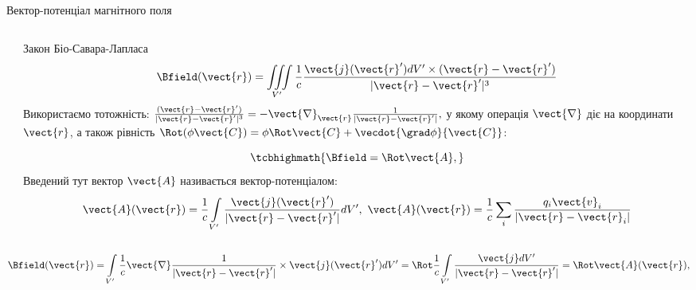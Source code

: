 \documentclass{beamer}
\begin{document}
\begin{frame}[t]{Вектор-потенціал магнітного поля}{}
\begin{columns}
\begin{column}{0.3\linewidth}
		\end{column}
		\begin{column}{0.7\linewidth}
			\begin{overprint}
				\begin{block}{}
					Закон Біо-Савара-Лапласа
					\begin{equation*}
						\Bfield(\vect{r}) = \iiint\limits_{V'} \frac1c \frac{ \vect{j}(\vect{r}')dV'\times(\vect{r} - \vect{r}') }{|\vect{r} -
							\vect{r}'|^3}
					\end{equation*}
					{\scriptsize
					Використаємо тотожність:
					\(
					\frac{ (\vect{r} - \vect{r}') }{|\vect{r} - \vect{r}'|^3} = - \vect{\nabla}_{\vect{r}} \frac{ 1 }{|\vect{r} - \vect{r}'|},
					\)
					у якому операція $\vect{\nabla}$ діє на координати $\vect{r}$, а також рівність
					$\Rot(\phi\vect{C}) = \phi\Rot\vect{C} + \vecdot{\grad\phi}{\vect{C}} $:}
				\end{block}
				\onslide<2>
				\begin{block}{}
					\begin{equation*}
						\tcbhighmath{\Bfield = \Rot\vect{A},}
					\end{equation*}
					Введений тут вектор $\vect{A}$ називається \alert{вектор-потенціалом}:
					\begin{equation*}
						\vect{A}(\vect{r}) = \frac1c \int\limits_{V'} \frac{\vect{j}(\vect{r}')}{|\vect{r} - \vect{r}'|} dV',
						\
						\vect{A}(\vect{r}) = \frac1c \sum\limits_i \frac{q_i\vect{v}_i}{|\vect{r} - \vect{r}_i|}
					\end{equation*}
				\end{block}
			\end{overprint}
		\end{column}
	\end{columns}
	\begin{overprint}
		\begin{block}{}
			\begin{equation*}
				\Bfield(\vect{r}) =\int\limits_{V'} \frac1c \vect{\nabla} \frac{ 1 }{|\vect{r} - \vect{r}'|}\times\vect{j} (\vect{r}') dV'  =
				\Rot \frac1c \int\limits_{V'} \frac{\vect{j}dV'}{|\vect{r} - \vect{r}'|}  = \Rot\vect{A}(\vect{r}),

\end{equation*}
\end{block}
\end{overprint}
\end{frame}
\end{document}
